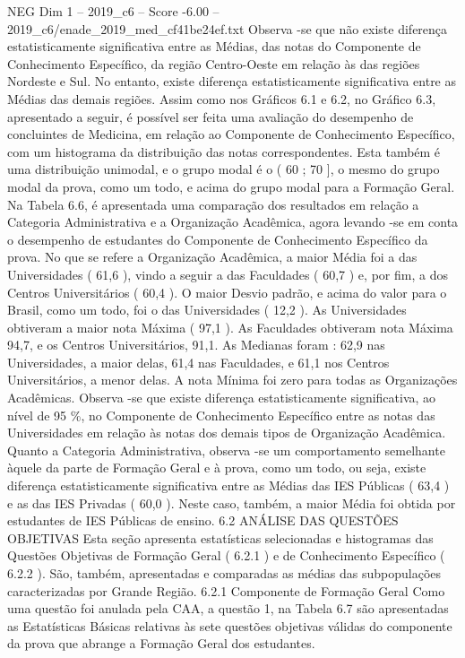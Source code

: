 \begin{textsample}{NEG Dim 1 – 2019\_c6 – Score -6.00 – 2019\_c6/enade\_2019\_med\_cf41be24ef.txt}
Observa -se que não existe diferença estatisticamente significativa entre as Médias, das notas do Componente de Conhecimento Específico, da região Centro-Oeste em relação às das regiões Nordeste e Sul.
No entanto, existe diferença estatisticamente significativa entre as Médias das demais regiões.
Assim como nos Gráficos 6.1 e 6.2, no Gráfico 6.3, apresentado a seguir, é possível ser feita uma avaliação do desempenho de concluintes de Medicina, em relação ao Componente de Conhecimento Específico, com um histograma da distribuição das notas correspondentes.
Esta também é uma distribuição unimodal, e o grupo modal é o ( 60 ; 70 ], o mesmo do grupo modal da prova, como um todo, e acima do grupo modal para a Formação Geral.
Na Tabela 6.6, é apresentada uma comparação dos resultados em relação a Categoria Administrativa e a Organização Acadêmica, agora levando -se em conta o desempenho de estudantes do Componente de Conhecimento Específico da prova.
No que se refere a Organização Acadêmica, a maior Média foi a das Universidades ( 61,6 ), vindo a seguir a das Faculdades ( 60,7 ) e, por fim, a dos Centros Universitários ( 60,4 ).
O maior Desvio padrão, e acima do valor para o Brasil, como um todo, foi o das Universidades ( 12,2 ).
As Universidades obtiveram a maior nota Máxima ( 97,1 ).
As Faculdades obtiveram nota Máxima 94,7, e os Centros Universitários, 91,1.
As Medianas foram : 62,9 nas Universidades, a maior delas, 61,4 nas Faculdades, e 61,1 nos Centros Universitários, a menor delas.
A nota Mínima foi zero para todas as Organizações Acadêmicas.
Observa -se que existe diferença estatisticamente significativa, ao nível de 95 \%, no Componente de Conhecimento Específico entre as notas das Universidades em relação às notas dos demais tipos de Organização Acadêmica.
Quanto a Categoria Administrativa, observa -se um comportamento semelhante àquele da parte de Formação Geral e à prova, como um todo, ou seja, existe diferença estatisticamente significativa entre as Médias das IES Públicas ( 63,4 ) e as das IES Privadas ( 60,0 ).
Neste caso, também, a maior Média foi obtida por estudantes de IES Públicas de ensino. 6.2 ANÁLISE DAS QUESTÕES OBJETIVAS Esta seção apresenta estatísticas selecionadas e histogramas das Questões Objetivas de Formação Geral ( 6.2.1 ) e de Conhecimento Específico ( 6.2.2 ).
São, também, apresentadas e comparadas as médias das subpopulações caracterizadas por Grande Região. 6.2.1 Componente de Formação Geral Como uma questão foi anulada pela CAA, a questão 1, na Tabela 6.7 são apresentadas as Estatísticas Básicas relativas às sete questões objetivas válidas do componente da prova que abrange a Formação Geral dos estudantes.

\end{textsample}
